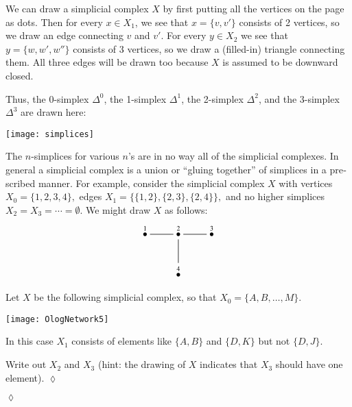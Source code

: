 \documentclass[a4paper]{book}
\newcommand{\LMO}[1]{\stackrel{#1}{\bullet}}
\theoremstyle{myth}
\newtheorem{excENG}[envENG]{\begin{english}Exercise\end{english}}
\newenvironment{exerciseENG}{\begin{excENG}}{\hspace*{\fill}$\lozenge$\end{excENG}}
\newtheorem{excRUS}[envRUS]{\begin{russian}Упражнение\end{russian}}
\newenvironment{exerciseRUS}{\begin{excRUS}}{\hspace*{\fill}$\lozenge$\end{excRUS}}
\begin{document}
\begin{english}
We can draw a simplicial complex $X$ by first putting all the vertices on the page as dots. Then for every $x\in X_1$, we see that $x=\{v,v'\}$ consists of 2 vertices, so we draw an edge connecting $v$ and $v'$. For every $y\in X_2$ we see that $y=\{w,w',w''\}$ consists of 3 vertices, so we draw a (filled-in) triangle connecting them. All three edges will be drawn too because $X$ is assumed to be downward closed.

\begin{russian} \end{russian}

Thus, the 0-simplex $\Delta^0$, the 1-simplex $\Delta^1$, the 2-simplex $\Delta^2$, and the 3-simplex $\Delta^3$ are drawn here:
\begin{center}
\texttt{[image: simplices]}
\end{center} 

\begin{russian} \end{russian}

The $n$-simplices for various $n$'s are in no way all of the simplicial complexes. In general a simplicial complex is a union or “gluing together” of simplices in a prescribed manner. For example, consider the simplicial complex $X$ with vertices $X_0=\{1,2,3,4\},$ edges $X_1=\{\{1,2\},\{2,3\},\{2,4\}\},$ and no higher simplices $X_2=X_3=\cdots=\emptyset$. We might draw $X$ as follows:
$$\xymatrix{\LMO{1}\ar@{-}[r]&\LMO{2}\ar@{-}[r]\ar@{-}[d]&\LMO{3}\\&\LMO{4}}$$

\begin{russian} \end{russian}

\begin{exerciseENG}
Let $X$ be the following simplicial complex, so that $X_0=\{A,B,\ldots,M\}$. 
\begin{center}
\texttt{[image: OlogNetwork5]}
\end{center} 
In this case $X_1$ consists of elements like $\{A,B\}$ and $\{D,K\}$ but not $\{D,J\}$. 

Write out $X_2$ and $X_3$ (hint: the drawing of $X$ indicates that $X_3$ should have one element).
\end{exerciseENG}

\begin{exerciseRUS}
\begin{russian} \end{russian}
\end{exerciseRUS}


\end{english}
\end{document}
